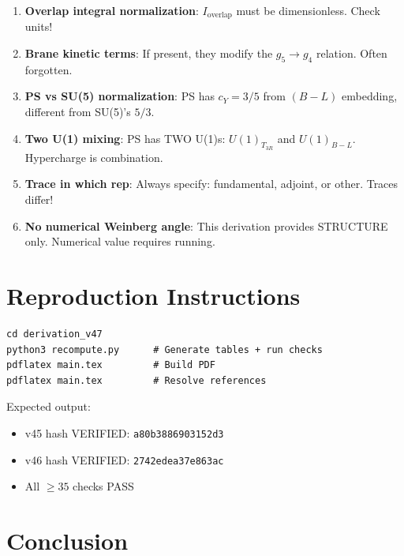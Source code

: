 \documentclass[11pt,a4paper]{article}
\begin{document}
\begin{enumerate}[label=\textbf{Trap \arabic*}:]
\item \textbf{Overlap integral normalization}:
$I_{\text{overlap}}$ must be dimensionless. Check units!

\item \textbf{Brane kinetic terms}:
If present, they modify the $g_5 \to g_4$ relation. Often forgotten.

\item \textbf{PS vs SU(5) normalization}:
PS has $c_Y = 3/5$ from $(B-L)$ embedding, different from SU(5)'s $5/3$.

\item \textbf{Two U(1) mixing}:
PS has TWO U(1)s: $U(1)_{T_{3R}}$ and $U(1)_{B-L}$. Hypercharge is combination.

\item \textbf{Trace in which rep}:
Always specify: fundamental, adjoint, or other. Traces differ!

\item \textbf{No numerical Weinberg angle}:
This derivation provides STRUCTURE only. Numerical value requires running.

\end{enumerate}

\section{Reproduction Instructions}
\label{sec:reproduction}

\begin{verbatim}
cd derivation_v47
python3 recompute.py      # Generate tables + run checks
pdflatex main.tex         # Build PDF
pdflatex main.tex         # Resolve references
\end{verbatim}

Expected output:
\begin{itemize}
\item v45 hash VERIFIED: \texttt{a80b3886903152d3}
\item v46 hash VERIFIED: \texttt{2742edea37e863ac}
\item All $\geq 35$ checks PASS
\end{itemize}

\section{Conclusion}
\label{sec:conclusion}
\end{document}
